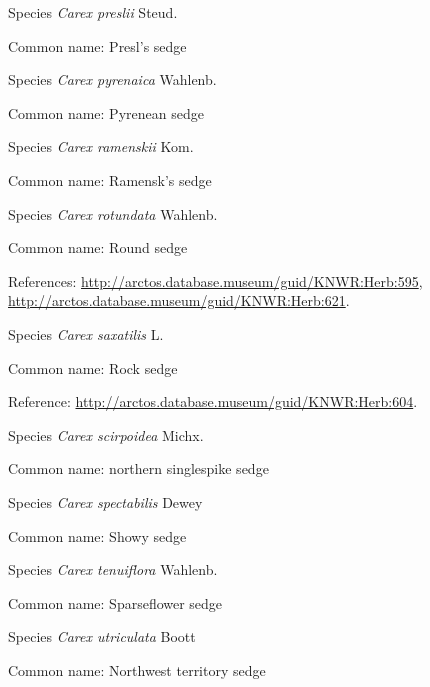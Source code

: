 \documentclass[9pt, article]{memoir}
\begin{document}
\begin{multicols}{2}
\vspace{6pt}\noindent\hspace{36pt}Species \textit{Carex preslii} Steud.


Common name: Presl's sedge

\vspace{6pt}\noindent\hspace{36pt}Species \textit{Carex pyrenaica} Wahlenb.


Common name: Pyrenean sedge

\vspace{6pt}\noindent\hspace{36pt}Species \textit{Carex ramenskii} Kom.


Common name: Ramensk's sedge

\vspace{6pt}\noindent\hspace{36pt}Species \textit{Carex rotundata} Wahlenb.


Common name: Round sedge

References: 
\url{http://arctos.database.museum/guid/KNWR:Herb:595}, 
\url{http://arctos.database.museum/guid/KNWR:Herb:621}.

\vspace{6pt}\noindent\hspace{36pt}Species \textit{Carex saxatilis} L.


Common name: Rock sedge

Reference: 
\url{http://arctos.database.museum/guid/KNWR:Herb:604}.

\vspace{6pt}\noindent\hspace{36pt}Species \textit{Carex scirpoidea} Michx.


Common name: northern singlespike sedge

\vspace{6pt}\noindent\hspace{36pt}Species \textit{Carex spectabilis} Dewey


Common name: Showy sedge

\vspace{6pt}\noindent\hspace{36pt}Species \textit{Carex tenuiflora} Wahlenb.


Common name: Sparseflower sedge

\vspace{6pt}\noindent\hspace{36pt}Species \textit{Carex utriculata} Boott


Common name: Northwest territory sedge


\end{multicols}
\end{document}
